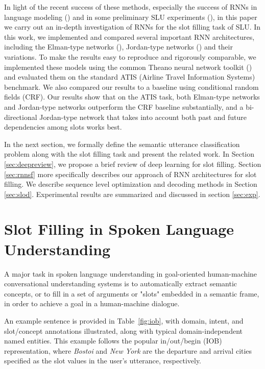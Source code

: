 In light of the recent success of these methods, especially the success of RNNs
in language modeling (\cite{rnn22, rnn23}) and in some preliminary SLU experiments
(\cite{rnn15,rnn24,rnn30,rnn56}), in this paper we carry out an in-depth investigation of RNNs for
the slot filling task of SLU. In this work, we implemented and compared several
important RNN architectures, including the Elman-type networks (\cite{rnn16}),
Jordan-type networks (\cite{rnn17}) and their variations. To make the results easy to
reproduce and rigorously comparable, we implemented these models using the
common Theano neural network toolkit (\cite{rnn25}) and evaluated them on the standard
ATIS (Airline Travel Information Systems) benchmark. We also compared our
results to a baseline using conditional random fields (CRF). Our results show
that on the ATIS task, both Elman-type networks and Jordan-type networks
outperform the CRF baseline substantially, and a bi-directional Jordan-type
network that takes into account both past and future dependencies among slots
works best.

In the next section, we formally define the semantic utterance
classification problem along with the slot filling task and present the
related work. In Section \ref{sec:deepreview}, we propose a brief review of deep learning
for slot filling. Section \ref{sec:rnnsf} more specifically describes our approach of
RNN architectures for slot filling. We describe sequence level
optimization and decoding methods in Section \ref{sec:slod}. Experimental results
are summarized and discussed in section \ref{sec:exp}.

\section{Slot Filling in Spoken Language Understanding}
\label{sec:sfslu}

A major task in spoken language understanding in goal-oriented human-machine
conversational understanding systems is to automatically extract semantic
concepts, or to fill in a set of arguments or "slots" embedded in a semantic
frame, in order to achieve a goal in a human-machine dialogue. 

An example sentence is provided in Table~\ref{fig:iob}, with domain, intent, and slot/concept
annotations illustrated, along with typical domain-independent named entities.
This example follows the popular in/out/begin (IOB) representation, where {\it
Bostoi} and {\it New York} are the departure and arrival cities specified as
the slot values in the user's utterance, respectively.

